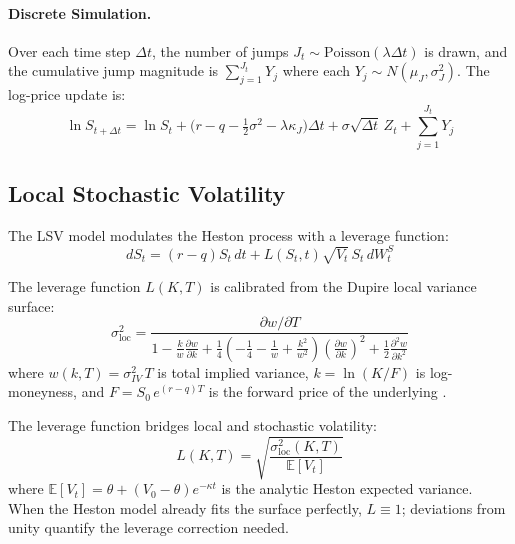\documentclass[12pt,a4paper]{article}
\begin{document}
\paragraph{Discrete Simulation.}
Over each time step $\Delta t$, the number of jumps $J_t \sim \text{Poisson}(\lambda \Delta t)$ is drawn, and the cumulative jump magnitude is $\sum_{j=1}^{J_t} Y_j$ where each $Y_j \sim N(\mu_J, \sigma_J^2)$. The log-price update is:
\begin{equation}
\ln S_{t+\Delta t} = \ln S_t + \bigl(r - q - \tfrac{1}{2}\sigma^2 - \lambda\kappa_J\bigr)\Delta t + \sigma\sqrt{\Delta t}\,Z_t + \sum_{j=1}^{J_t} Y_j
\end{equation}

\subsection{Local Stochastic Volatility}

The LSV model \parencite{gatheral2006} modulates the Heston process with a leverage function:
\begin{equation}
dS_t = (r - q)S_t\,dt + L(S_t, t)\sqrt{V_t}\,S_t\,dW_t^S
\end{equation}

The leverage function $L(K, T)$ is calibrated from the Dupire local variance surface:
\begin{equation}
\sigma_{\text{loc}}^2 = \frac{\partial w/\partial T}{1 - \frac{k}{w}\frac{\partial w}{\partial k} + \frac{1}{4}\!\left(-\frac{1}{4} - \frac{1}{w} + \frac{k^2}{w^2}\right)\!\left(\frac{\partial w}{\partial k}\right)^{\!2} + \frac{1}{2}\frac{\partial^2 w}{\partial k^2}}
\end{equation}
where $w(k, T) = \sigma_{IV}^2\,T$ is total implied variance, $k = \ln(K/F)$ is log-moneyness, and $F = S_0\,e^{(r-q)T}$ is the forward price of the underlying \parencite{gatheral2006}.

The leverage function bridges local and stochastic volatility:
\begin{equation}
L(K, T) = \sqrt{\frac{\sigma_{\text{loc}}^2(K, T)}{\mathbb{E}[V_t]}}
\end{equation}
where $\mathbb{E}[V_t] = \theta + (V_0 - \theta)e^{-\kappa t}$ is the analytic Heston expected variance. When the Heston model already fits the surface perfectly, $L \equiv 1$; deviations from unity quantify the leverage correction needed.
\end{document}
